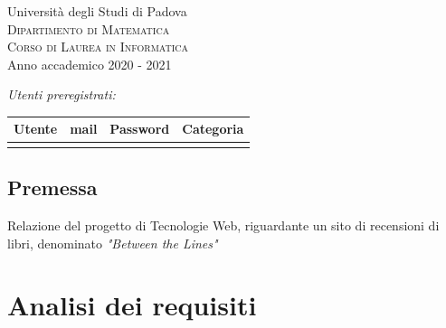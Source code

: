 \documentclass[12pt,a4paper,headings=optiontohead]{scrbook}
\begin{document}
\begin{titlepage}
\vspace{1.5cm}
{\LARGE Università degli Studi di Padova}\\[0.4cm] %
\textsc{\large{Dipartimento di Matematica}}\\[0.05cm]
\textsc{\large{Corso di Laurea in Informatica}}\\[0.5cm]%
{\Large Anno accademico 2020 - 2021}\\ %

\vfill %



\emph{\Large{Utenti preregistrati:}}\\

\renewcommand{\arraystretch}{1.4}
 \begin{center}
 \begin{tabular}{|r|l|l|l|}
 \hline
\textbf{Utente} & \textbf{mail} & \textbf{Password} & \textbf{Categoria}  \\ \hline \hline
 &  &  & \\ \hline

 \end{tabular}
 \end{center}

\end{titlepage}


\begin{center}
\pagebreak

\section*{Premessa}
\begin{minipage}{0.9\textwidth} 
\large{Relazione del progetto di Tecnologie Web, riguardante un sito di recensioni di libri, denominato \textit{"Between the Lines"}}

\end{minipage}

\end{center}
\pagebreak

\tableofcontents

\section{Analisi dei requisiti}
\end{document}
